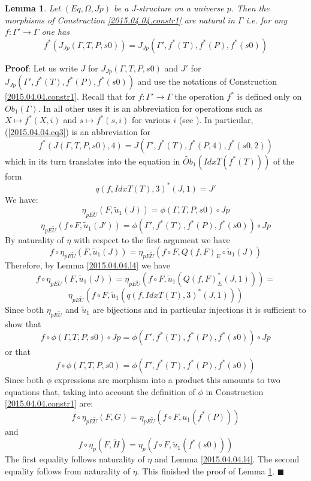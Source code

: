 \documentclass[12pt]{article}
\numberwithin{equation}{section}
\newenvironment{eq}{\begin{equation}}{\end{equation}}
\newenvironment{myproof}{{\bf Proof}:}{$\blacksquare$ \vskip 5mm }
\newtheorem{lemma}[proposition]{Lemma}
\newcommand{\llabel}[1]{\label{#1}}
\newcommand{\sr}{\rightarrow}
\newcommand{\wt}{\widetilde}
\begin{document}
%
\begin{lemma}
\llabel{2015.04.04.l1} Let $(Eq,\Omega,Jp)$ be a J-structure on a universe
$p$. Then the morphisms of Construction \ref{2015.04.04.constr1} are natural in
$\Gamma$ i.e. for any $f:\Gamma'\sr \Gamma$ one has
%
\begin{eq}\llabel{2015.04.04.eq3}
f^*(J_{Jp}(\Gamma,T,P,s0))=J_{Jp}(\Gamma',f^*(T),f^*(P),f^*(s0))
\end{eq}
%
\end{lemma}
%
\begin{myproof}
Let us write $J$ for $J_{Jp}(\Gamma,T,P,s0)$ and $J'$ for
$J_{Jp}(\Gamma',f^*(T),f^*(P),f^*(s0))$ and use the notations of Construction
\ref{2015.04.04.constr1}. Recall that for $f:\Gamma'\sr \Gamma$ the operation
$f^*$ is defined only on $Ob_1(\Gamma)$. In all other uses it is an
abbreviation for operations such as $X\mapsto f^*(X,i)$ and $s\mapsto f^*(s,i)$
for various $i$ (see \cite{Csubsystems}). In particular, (\ref{2015.04.04.eq3})
is an abbreviation for
%
$$f^*(J(\Gamma,T,P,s0),4)=J(\Gamma',f^*(T),f^*(P,4),f^*(s0,2))$$
%
which in its turn translates into the equation in $\wt{Ob}_1(IdxT(f^*(T)))$ of
the form
%
$$q(f,IdxT(T),3)^*(J,1)=J'$$
%
We have:
%
$$\eta_{pE\wt{U}}(F,\wt{u}_1(J))=\phi(\Gamma,T,P,s0)\circ Jp$$
$$\eta_{pE\wt{U}}(f\circ F,
\wt{u}_1(J'))=\phi(\Gamma',f^*(T),f^*(P),f^*(s0))\circ Jp$$
%
By naturality of $\eta$ with respect to the first argument we have
%
$$f\circ \eta_{pE\wt{U}}(F,\wt{u}_1(J))=\eta_{pE\wt{U}}(f\circ F,
Q(f,F)_{E}\circ \wt{u}_1(J))$$
%
Therefore, by Lemma \ref{2015.04.04.l4} we have
%
$$f\circ \eta_{pE\wt{U}}(F,\wt{u}_1(J))=\eta_{pE\wt{U}}(f\circ F,
\wt{u}_1(Q(f,F)_{E}^*(J,1)))=$$
$$\eta_{pE\wt{U}}(f\circ F, \wt{u}_1(q(f,IdxT(T),3)^*(J,1)))$$
%
Since both $\eta_{pE\wt{U}}$ and $\wt{u}_1$ are bijections and in particular
injections it is sufficient to show that
%
$$f\circ \phi(\Gamma,T,P,s0)\circ Jp = \phi(\Gamma',f^*(T),f^*(P),f^*(s0))\circ
Jp$$
%
or that
%
$$f\circ \phi(\Gamma,T,P,s0)=\phi(\Gamma',f^*(T),f^*(P),f^*(s0))$$
%
Since both $\phi$ expressions are morphism into a product this amounts to two
equations that, taking into account the definition of $\phi$ in Construction
\ref{2015.04.04.constr1} are:
%
$$f\circ \eta_{pE\wt{U}}(F,G)=\eta_{pE\wt{U}}(f\circ F, u_1(f^*(P)))$$
%
and
%
$$f\circ \eta_p(F,\wt{H})=\eta_p(f\circ F, \wt{u}_1(f^*(s0)))$$
%
The first equality follows naturality of $\eta$ and Lemma
\ref{2015.04.04.l4}. The second equality follows from naturality of
$\eta$. This finished the proof of Lemma \ref{2015.04.04.l1}.
\end{myproof}
\end{document}
